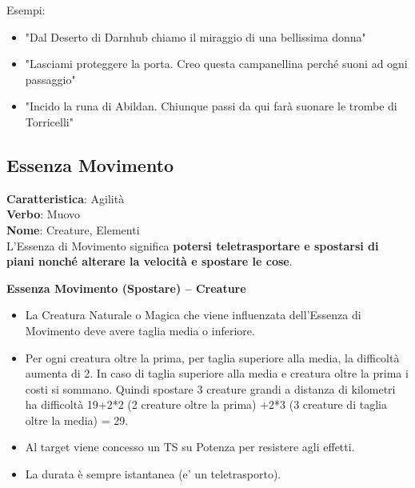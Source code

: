 \documentclass[a4paper,11pt,twoside,openany]{book}
\begin{document}
\bigskip

Esempi:
\begin{itemize}
	\item
	      "Dal Deserto di Darnhub chiamo il miraggio di una bellissima donna"
	\item
	      "Lasciami proteggere la porta. Creo questa campanellina perché suoni ad ogni passaggio"
	\item
	      "Incido la runa di Abildan. Chiunque passi da qui farà suonare le trombe di Torricelli"
\end{itemize}

\pagebreak

\subsection{Essenza Movimento}

\label{essenza-movimento---agilita}

\textbf{Caratteristica}: Agilità\\
\textbf{Verbo}: Muovo\\
\textbf{Nome}: Creature, Elementi\\


L'Essenza di Movimento significa \textbf{potersi teletrasportare e spostarsi di piani nonché alterare la velocità e spostare le cose}.

\textbf{Essenza Movimento (Spostare) -- Creature}

\begin{itemize}
	\item
	      La Creatura Naturale o Magica che viene influenzata dell'Essenza di Movimento deve avere taglia media o inferiore.
	\item
	      Per ogni creatura oltre la prima, per taglia superiore alla media, la difficoltà aumenta di 2. In caso di taglia superiore alla media e creatura oltre la prima i costi si sommano. Quindi spostare 3 creature grandi a distanza di kilometri ha difficoltà 19+2*2 (2 creature oltre la prima) +2*3 (3 creature di taglia oltre la media) = 29.
	\item
	      Al target viene concesso un TS su Potenza per resistere agli effetti.
	\item
	      La durata è sempre istantanea (e' un teletrasporto).
\end{itemize}

\bigskip
\end{document}
